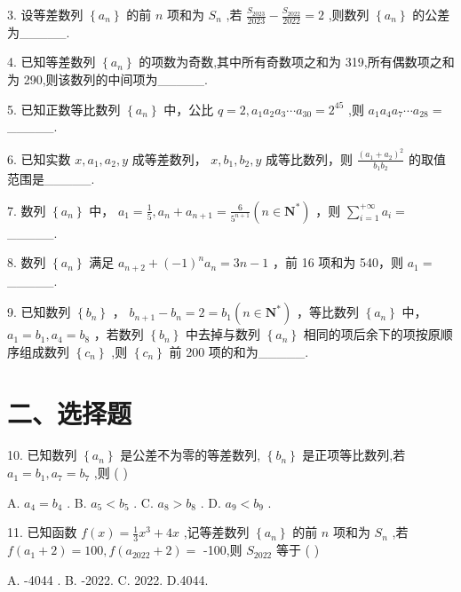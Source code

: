 3. 设等差数列 $\left\{  {a}_{n}\right\}$ 的前 $n$ 项和为 ${S}_{n}$ ,若 $\frac{{S}_{2023}}{2023} - \frac{{S}_{2022}}{2022} = 2$ ,则数列 $\left\{  {a}_{n}\right\}$ 的公差为\_\_\_\_\_.

4. 已知等差数列 $\left\{  {a}_{n}\right\}$ 的项数为奇数,其中所有奇数项之和为 319,所有偶数项之和为 290,则该数列的中间项为\_\_\_\_\_.

5. 已知正数等比数列 $\left\{  {a}_{n}\right\}$ 中，公比 $q = 2,{a}_{1}{a}_{2}{a}_{3}\cdots {a}_{30} = {2}^{45}$ ,则 ${a}_{1}{a}_{4}{a}_{7}\cdots {a}_{28} =$ \_\_\_\_\_.

6. 已知实数 $x,{a}_{1},{a}_{2},y$ 成等差数列， $x,{b}_{1},{b}_{2},y$ 成等比数列，则 $\frac{{\left( {a}_{1} + {a}_{2}\right) }^{2}}{{b}_{1}{b}_{2}}$ 的取值范围是\_\_\_\_\_.

7. 数列 $\left\{  {a}_{n}\right\}$ 中， ${a}_{1} = \frac{1}{5},{a}_{n} + {a}_{n + 1} = \frac{6}{{5}^{n + 1}}\left( {n \in  {\mathbf{N}}^{ * }}\right)$ ，则 $\mathop{\sum }\limits_{{i = 1}}^{{+\infty }}{a}_{i} =$ \_\_\_\_\_.

8. 数列 $\left\{  {a}_{n}\right\}$ 满足 ${a}_{n + 2} + {\left( -1\right) }^{n}{a}_{n} = {3n} - 1$ ，前 16 项和为 540，则 ${a}_{1} =$ \_\_\_\_\_.

9. 已知数列 $\left\{  {b}_{n}\right\}$ ， ${b}_{n + 1} - {b}_{n} = 2 = {b}_{1}\left( {n \in  {\mathbf{N}}^{ * }}\right)$ ，等比数列 $\left\{  {a}_{n}\right\}$ 中， ${a}_{1} = {b}_{1},{a}_{4} = {b}_{8}$ ，若数列 $\left\{  {b}_{n}\right\}$ 中去掉与数列 $\left\{  {a}_{n}\right\}$ 相同的项后余下的项按原顺序组成数列 $\left\{  {c}_{n}\right\}$ ,则 $\left\{  {c}_{n}\right\}$ 前 200 项的和为\_\_\_\_\_.

\section*{二、选择题}

10. 已知数列 $\left\{  {a}_{n}\right\}$ 是公差不为零的等差数列, $\left\{  {b}_{n}\right\}$ 是正项等比数列,若 ${a}_{1} = {b}_{1},{a}_{7} = {b}_{7}$ ,则 ( )

A. ${a}_{4} = {b}_{4}$ . B. ${a}_{5} < {b}_{5}$ . C. ${a}_{8} > {b}_{8}$ . D. ${a}_{9} < {b}_{9}$ .

11. 已知函数 $f\left( x\right)  = \frac{1}{3}{x}^{3} + {4x}$ ,记等差数列 $\left\{  {a}_{n}\right\}$ 的前 $n$ 项和为 ${S}_{n}$ ,若 $f\left( {{a}_{1} + 2}\right)  = {100},f\left( {{a}_{2022} + 2}\right)  =$ -100,则 ${S}_{2022}$ 等于 ( )

A. -4044 . B. -2022. C. 2022. D.4044.


